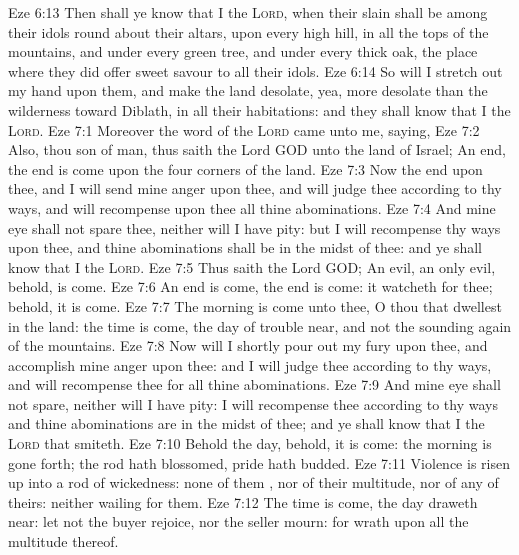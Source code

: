 \vs Eze 6:13 Then shall ye know that I  the \textsc{Lord}, when their slain  shall be among their idols round about their altars, upon every high hill, in all the tops of the mountains, and under every green tree, and under every thick oak, the place where they did offer sweet savour to all their idols.
\vs Eze 6:14 So will I stretch out my hand upon them, and make the land desolate, yea, more desolate than the wilderness toward Diblath, in all their habitations: and they shall know that I  the \textsc{Lord}.
\vs Eze 7:1 Moreover the word of the \textsc{Lord} came unto me, saying,
\vs Eze 7:2 Also, thou son of man, thus saith the Lord GOD unto the land of Israel; An end, the end is come upon the four corners of the land.
\vs Eze 7:3 Now  the end  upon thee, and I will send mine anger upon thee, and will judge thee according to thy ways, and will recompense upon thee all thine abominations.
\vs Eze 7:4 And mine eye shall not spare thee, neither will I have pity: but I will recompense thy ways upon thee, and thine abominations shall be in the midst of thee: and ye shall know that I  the \textsc{Lord}.
\vs Eze 7:5 Thus saith the Lord GOD; An evil, an only evil, behold, is come.
\vs Eze 7:6 An end is come, the end is come: it watcheth for thee; behold, it is come.
\vs Eze 7:7 The morning is come unto thee, O thou that dwellest in the land: the time is come, the day of trouble  near, and not the sounding again of the mountains.
\vs Eze 7:8 Now will I shortly pour out my fury upon thee, and accomplish mine anger upon thee: and I will judge thee according to thy ways, and will recompense thee for all thine abominations.
\vs Eze 7:9 And mine eye shall not spare, neither will I have pity: I will recompense thee according to thy ways and thine abominations  are in the midst of thee; and ye shall know that I  the \textsc{Lord} that smiteth.
\vs Eze 7:10 Behold the day, behold, it is come: the morning is gone forth; the rod hath blossomed, pride hath budded.
\vs Eze 7:11 Violence is risen up into a rod of wickedness: none of them , nor of their multitude, nor of any of theirs: neither  wailing for them.
\vs Eze 7:12 The time is come, the day draweth near: let not the buyer rejoice, nor the seller mourn: for wrath  upon all the multitude thereof.
